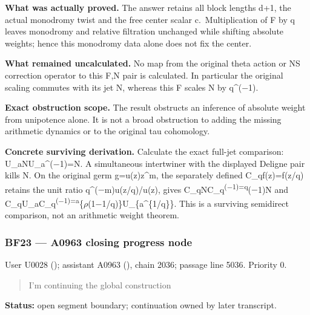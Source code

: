 \textbf{What was actually proved.} The answer retains all block lengths
d+1, the actual monodromy twist and the free center scalar
c.~Multiplication of F by q leaves monodromy and relative filtration
unchanged while shifting absolute weights; hence this monodromy data
alone does not fix the center.

\textbf{What remained uncalculated.} No map from the original theta
action or NS correction operator to this F,N pair is calculated. In
particular the original scaling commutes with its jet N, whereas this F
scales N by
q\textasciicircum{}(\allowbreak{}\ensuremath{−}\allowbreak{}1).

\textbf{Exact obstruction scope.} The result obstructs an inference of
absolute weight from unipotence alone. It is not a broad obstruction to
adding the missing arithmetic dynamics or to the original tau
cohomology.

\textbf{Concrete surviving derivation.} Calculate the exact full-jet
comparison:
U\_aNU\_a\textasciicircum{}(\allowbreak{}\ensuremath{−}\allowbreak{}1)=N.
A simultaneous intertwiner with the displayed Deligne pair kills N. On
the original germ g=u(z)z\^{}m, the separately defined C\_qf(z)=f(z/q)
retains the unit ratio
q\textasciicircum{}(\allowbreak{}\ensuremath{−}\allowbreak{}m)u(z/q)/u(z),
gives
C\_qNC\_q\textsuperscript{(\allowbreak{}\ensuremath{−}\allowbreak{}1)=q}(\allowbreak{}\ensuremath{−}\allowbreak{}1)N
and
C\_qU\_aC\_q\textsuperscript{(\allowbreak{}\ensuremath{−}\allowbreak{}1)=a}\{\allowbreak{}\ensuremath{ρ}\allowbreak{}(1\allowbreak{}\ensuremath{−}\allowbreak{}1/q)\}U\_\{a\textasciicircum{}\{1/q\}\}.
This is a surviving semidirect comparison, not an arithmetic weight
theorem.

\subsubsection{BF23 --- A0963 closing progress
node}\label{TranscriptLedgerStage:bf23-a0963-closing-progress-node}

User U0028 (\protect{});
assistant A0963 (\protect{}),
chain 2036; passage line 5036. Priority 0.

\begin{quote}
I'm continuing the global construction
\end{quote}

\textbf{Status:} open segment boundary; continuation owned by later
transcript.

